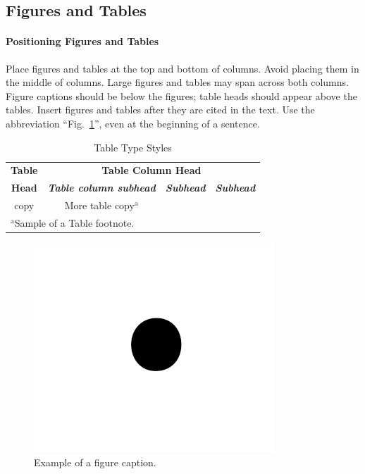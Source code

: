 \documentclass[conference]{IEEEtran}
\begin{document}
\subsection{Figures and Tables}
\paragraph{Positioning Figures and Tables} Place figures and tables at the top and 
bottom of columns. Avoid placing them in the middle of columns. Large 
figures and tables may span across both columns. Figure captions should be 
below the figures; table heads should appear above the tables. Insert 
figures and tables after they are cited in the text. Use the abbreviation 
``Fig.~\ref{fig}'', even at the beginning of a sentence.

\begin{table}[htbp]
\caption{Table Type Styles}
\begin{center}
\begin{tabular}{|c|c|c|c|}
\hline
\textbf{Table}&\multicolumn{3}{|c|}{\textbf{Table Column Head}} \\
\cline{2-4} 
\textbf{Head} & \textbf{\textit{Table column subhead}}& \textbf{\textit{Subhead}}& \textbf{\textit{Subhead}} \\
\hline
copy& More table copy$^{\mathrm{a}}$& &  \\
\hline
\multicolumn{4}{l}{$^{\mathrm{a}}$Sample of a Table footnote.}
\end{tabular}
\label{tab1}
\end{center}
\end{table}

\begin{figure}[htbp]
\centerline{\includegraphics{fig1.png}}
\caption{Example of a figure caption.}
\label{fig}
\end{figure}
\end{document}
